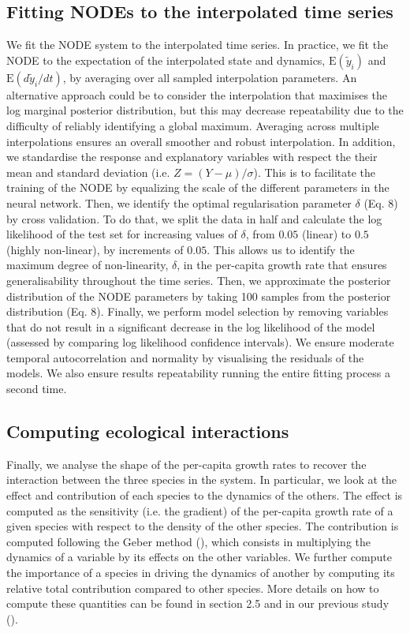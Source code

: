 \documentclass[11pt, oneside]{article}
\begin{document}
\subsection{Fitting NODEs to the interpolated time series}

We fit the NODE system to the interpolated time series.
In practice, we fit the NODE to the expectation of the interpolated state and dynamics, $\mathrm{E}(\tilde{y}_i)$ and $\mathrm{E}(d\tilde{y}_i/dt)$, by averaging over all sampled interpolation parameters.
An alternative approach could be to consider the interpolation that maximises the log marginal posterior distribution, but this may decrease repeatability due to the difficulty of reliably identifying a global maximum.
Averaging across multiple interpolations ensures an overall smoother and robust interpolation. 
In addition, we standardise the response and explanatory variables with respect the their mean and standard deviation (i.e. $Z=(Y-\mu)/\sigma$).
This is to facilitate the training of the NODE by equalizing the scale of the different parameters in the neural network.
Then, we identify the optimal regularisation parameter $\delta$ (Eq. 8) by cross validation.
To do that, we split the data in half and calculate the log likelihood of the test set for increasing values of $\delta$, from $0.05$ (linear) to $0.5$ (highly non-linear), by increments of $0.05$.
This allows us to identify the maximum degree of non-linearity, $\delta$, in the per-capita growth rate that ensures generalisability throughout the time series.
Then, we approximate the posterior distribution of the NODE parameters by taking 100 samples from the posterior distribution (Eq. 8).
Finally, we perform model selection by removing variables that do not result in a significant decrease in the log likelihood of the model (assessed by comparing log likelihood confidence intervals).
We ensure moderate temporal autocorrelation and normality by visualising the residuals of the models.
We also ensure results repeatability running the entire fitting process a second time.

\subsection{Computing ecological interactions}

Finally, we analyse the shape of the per-capita growth rates to recover the interaction between the three species in the system.
In particular, we look at the effect and contribution of each species to the dynamics of the others.
The effect is computed as the sensitivity (i.e. the gradient) of the per-capita growth rate of a given species with respect to the density of the other species.
The contribution is computed following the Geber method (\cite{Hairston2005}), which consists in multiplying the dynamics of a variable by its effects on the other variables.
We further compute the importance of a species in driving the dynamics of another by computing its relative total contribution compared to other species.
More details on how to compute these quantities can be found in section 2.5 and in our previous study (\cite{Bonnaffe2021a}).
\end{document}
